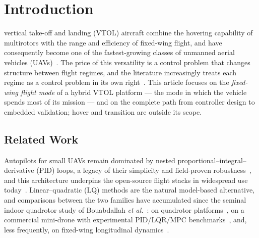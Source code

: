 \section{Introduction}
\label{sec:introduction}

 vertical take-off and landing (VTOL) aircraft
combine the hovering capability of multirotors with the range and
efficiency of fixed-wing flight, and have consequently become one of
the fastest-growing classes of unmanned aerial vehicles
(UAVs)~\cite{saeed2018survey,ducard2021review}. The price of this
versatility is a control problem that changes structure between flight
regimes, and the literature increasingly treats each regime as a
control problem in its own right~\cite{hu2024hybrid}. This article
focuses on the \emph{fixed-wing flight mode} of a hybrid VTOL platform
--- the mode in which the vehicle spends most of its mission --- and on
the complete path from controller design to embedded validation;
hover and transition are outside its scope.

\subsection{Related Work}
Autopilots for small UAVs remain dominated by nested
proportional--integral--derivative (PID) loops, a
legacy of their simplicity and field-proven
robustness~\cite{chao2010autopilots}, and this architecture underpins
the open-source flight stacks in widespread use
today~\cite{ebeid2018survey,meier2015px4}. Linear--quadratic (LQ)
methods are the natural model-based alternative, and comparisons
between the two families have accumulated since the seminal indoor
quadrotor study of Bouabdallah \emph{et
al.}~\cite{bouabdallah2004pid}: on quadrotor
platforms~\cite{argentim2013pid,rinaldi2023comparative}, on a
commercial mini-drone with experimental PID/LQR/MPC
benchmarks~\cite{okasha2022design}, and, less frequently, on
fixed-wing longitudinal dynamics~\cite{ingabire2019control}.

